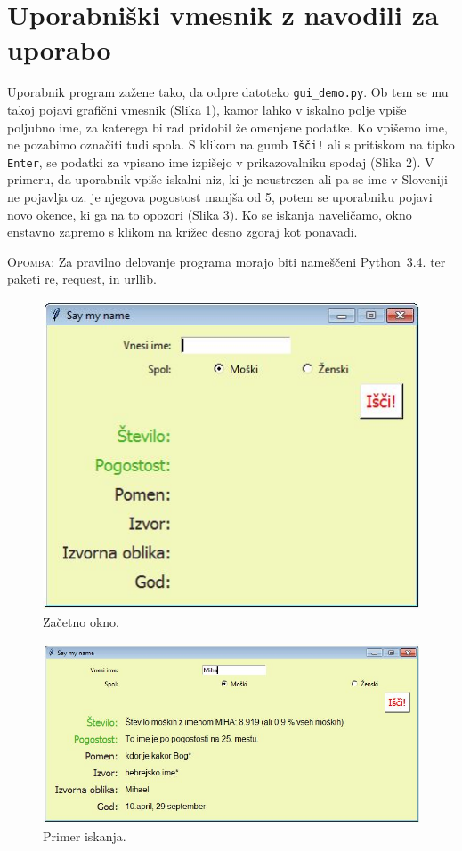 \documentclass[a4paper, 12pt]{article}
\begin{document}
\section{Uporabniški vmesnik z navodili za uporabo}

Uporabnik program zažene tako, da odpre datoteko \texttt{gui\_demo.py}. Ob tem se mu takoj pojavi grafični vmesnik (Slika 1), kamor lahko v iskalno polje vpiše poljubno ime, za katerega bi rad pridobil že omenjene podatke. Ko vpišemo ime, ne pozabimo označiti tudi spola. S klikom na gumb \texttt{Išči!} ali s pritiskom na tipko \texttt{Enter}, se podatki za vpisano ime izpišejo v prikazovalniku spodaj (Slika 2). V primeru, da uporabnik vpiše iskalni niz, ki je neustrezen ali pa se ime v Sloveniji ne pojavlja oz. je njegova pogostost manjša od 5, potem se uporabniku pojavi novo okence, ki ga na to opozori (Slika 3). Ko se iskanja naveličamo, okno enstavno zapremo s klikom na križec desno zgoraj kot ponavadi.

\textsc{Opomba:} Za pravilno delovanje programa morajo biti nameščeni Python~3.4. ter paketi re, request, in urllib.

\begin{figure}[h]
\centering
\includegraphics[scale=0.8] {zacetek.jpg}
\caption{Začetno okno.}
\end{figure}

\begin{figure}[h]
\centering
\includegraphics[scale=0.6] {primer.jpg}
\caption{Primer iskanja.}
\end{figure}
\end{document}
